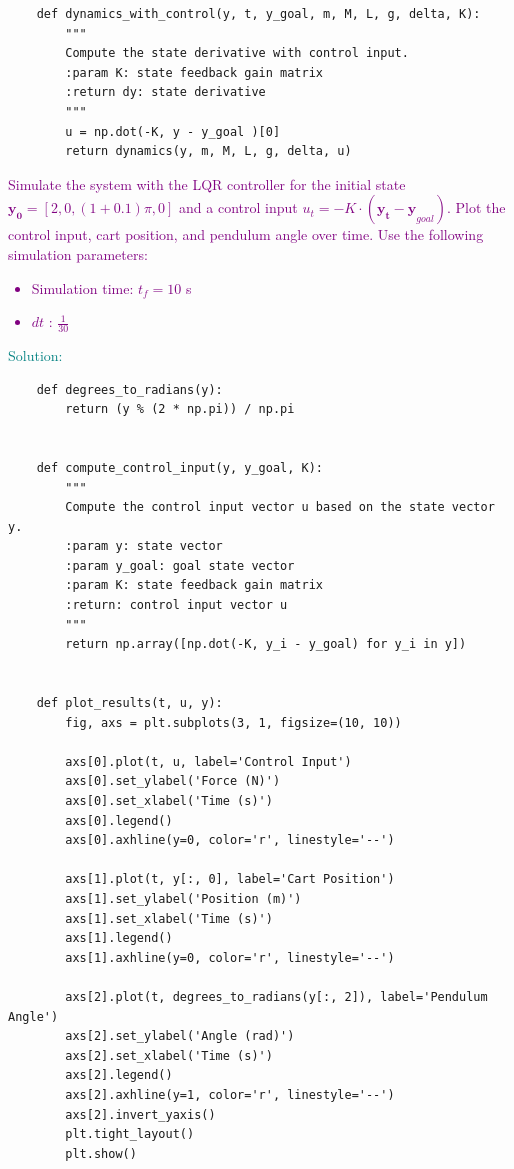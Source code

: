 \documentclass[a4 paper]{article}
\begin{document}
\begin{verbatim}
    def dynamics_with_control(y, t, y_goal, m, M, L, g, delta, K):
        """
        Compute the state derivative with control input.
        :param K: state feedback gain matrix
        :return dy: state derivative
        """
        u = np.dot(-K, y - y_goal )[0]
        return dynamics(y, m, M, L, g, delta, u)
\end{verbatim}


\bigbreak

\textcolor{purple}{
 Simulate the system with the LQR controller for the initial state \( \mathbf{y_0} = [2, 0, (1 + 0.1) \pi, 0] \) 
and a control input \( u_t = -K \cdot \left( \mathbf{y_t - y}_{goal} \right) \). 
Plot the control input, cart position, and pendulum angle over time.
Use the following simulation parameters:
\begin{itemize}
    \item Simulation time: \( t_f = 10 \) s
    \item $dt$ : \( \frac{1}{30} \)
\end{itemize}
}

\medbreak

\textcolor{teal}{
    Solution:
}

\begin{verbatim}
    def degrees_to_radians(y):
        return (y % (2 * np.pi)) / np.pi 


    def compute_control_input(y, y_goal, K):
        """
        Compute the control input vector u based on the state vector y.
        :param y: state vector
        :param y_goal: goal state vector
        :param K: state feedback gain matrix
        :return: control input vector u
        """
        return np.array([np.dot(-K, y_i - y_goal) for y_i in y])


    def plot_results(t, u, y):
        fig, axs = plt.subplots(3, 1, figsize=(10, 10))
        
        axs[0].plot(t, u, label='Control Input')
        axs[0].set_ylabel('Force (N)')
        axs[0].set_xlabel('Time (s)')
        axs[0].legend()
        axs[0].axhline(y=0, color='r', linestyle='--')

        axs[1].plot(t, y[:, 0], label='Cart Position')
        axs[1].set_ylabel('Position (m)')
        axs[1].set_xlabel('Time (s)')
        axs[1].legend()
        axs[1].axhline(y=0, color='r', linestyle='--')

        axs[2].plot(t, degrees_to_radians(y[:, 2]), label='Pendulum Angle')
        axs[2].set_ylabel('Angle (rad)')
        axs[2].set_xlabel('Time (s)')
        axs[2].legend()
        axs[2].axhline(y=1, color='r', linestyle='--')
        axs[2].invert_yaxis()
        plt.tight_layout()
        plt.show()
\end{verbatim}
\end{document}
